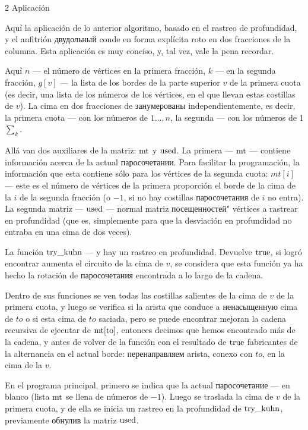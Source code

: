 \h2{ Aplicación }

Aquí la aplicación de lo anterior algoritmo, basado en el rastreo de profundidad, y el anfitrión двудольный conde en forma explícita roto en dos fracciones de la columna. Esta aplicación es muy conciso, y, tal vez, vale la pena recordar.

Aquí $n$ --- el número de vértices en la primera fracción, $k$ --- en la segunda fracción, $g[v]$ --- la lista de los bordes de la parte superior $v$ de la primera cuota (es decir, una lista de los números de los vértices, en el que llevan estas costillas de $v$). La cima en dos fracciones de занумерованы independientemente, es decir, la primera cuota --- con los números de $1 \ldots, n$, la segunda --- con los números de 1 $\sum_ k$.

Allá van dos auxiliares de la matriz: $\rm mt$ y $\rm used$. La primera --- $\rm mt$ --- contiene información acerca de la actual паросочетании. Para facilitar la programación, la información que esta contiene sólo para los vértices de la segunda cuota: $mt[i]$ --- este es el número de vértices de la primera proporción el borde de la cima de la $i$ de la segunda fracción (o $-1$, si no hay costillas паросочетания de $i$ no entra). La segunda matriz --- $\rm used$ --- normal matriz посещенностей" vértices a rastrear en profundidad (que es, simplemente para que la desviación en profundidad no entraba en una cima de dos veces).

La función $\rm try\_kuhn$ --- y hay un rastreo en profundidad. Devuelve $\rm true$, si logró encontrar aumenta el circuito de la cima de $v$, se considera que esta función ya ha hecho la rotación de паросочетания encontrada a lo largo de la cadena.

Dentro de sus funciones se ven todas las costillas salientes de la cima de $v$ de la primera cuota, y luego se verifica si la arista que conduce a ненасыщенную cima de $to$ o si esta cima de $to$ saciada, pero se puede encontrar mejoran la cadena recursiva de ejecutar de $\rm mt[to]$, entonces decimos que hemos encontrado más de la cadena, y antes de volver de la función con el resultado de $\rm true$ fabricantes de la alternancia en el actual borde: перенаправляем arista, conexo con $to$, en la cima de la $v$.

En el programa principal, primero se indica que la actual паросочетание --- en blanco (lista $\rm mt$ se llena de números de $-1$). Luego se traslada la cima de $v$ de la primera cuota, y de ella se inicia un rastreo en la profundidad de $\rm try\_kuhn$, previamente обнулив la matriz $\rm used$.

